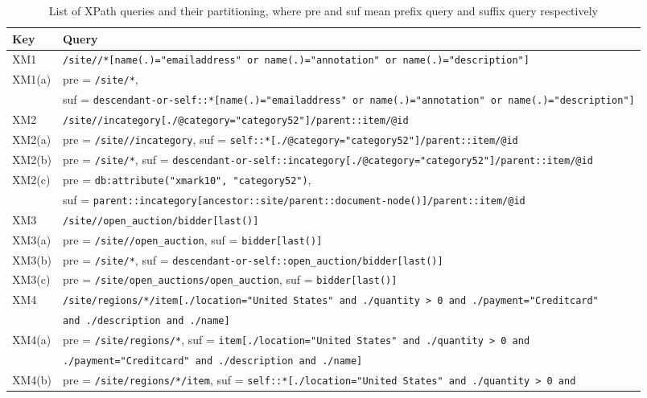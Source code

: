 
\begin{sidewaystable}
\centering
\caption{List of XPath queries and their partitioning, where pre and suf
mean prefix query and suffix query respectively}
\label{tab:dpsqueries}
\small
\begin{tabular}{l|l}
\hline
 Key & Query \\
\hline
 XM1  & \verb|/site//*[name(.)="emailaddress" or name(.)="annotation" or name(.)="description"]| \\
 XM1(a) & pre = \verb|/site/*|, \\
        & suf = \verb|descendant-or-self::*[name(.)="emailaddress" or name(.)="annotation" or name(.)="description"]| \\
\hline
 XM2 & \verb|/site//incategory[./@category="category52"]/parent::item/@id| \\
 XM2(a) & pre = \verb|/site//incategory|, \quad suf = \verb|self::*[./@category="category52"]/parent::item/@id| \\
 XM2(b) & pre = \verb|/site/*|, \quad suf = \verb|descendant-or-self::incategory[./@category="category52"]/parent::item/@id| \\
 XM2(c) & pre = \verb|db:attribute("xmark10", "category52")|, \\
        & suf = \verb|parent::incategory[ancestor::site/parent::document-node()]/parent::item/@id| \\
\hline
 XM3 & \verb|/site//open_auction/bidder[last()]| \\
 XM3(a) & pre = \verb|/site//open_auction|, \quad suf = \verb|bidder[last()]| \\
 XM3(b) & pre = \verb|/site/*|, \quad suf = \verb|descendant-or-self::open_auction/bidder[last()]| \\
 XM3(c) & pre = \verb|/site/open_auctions/open_auction|, \quad suf = \verb|bidder[last()]| \\
\hline
 XM4 & \verb|/site/regions/*/item[./location="United States" and ./quantity > 0 and ./payment="Creditcard"| \\
     & \verb|and ./description and ./name]| \\
 XM4(a) & pre = \verb|/site/regions/*|, \quad suf = \verb|item[./location="United States" and ./quantity > 0 and | \\
        & \verb|./payment="Creditcard" and ./description and ./name]| \\
 XM4(b) & pre = \verb|/site/regions/*/item|, \quad suf = \verb|self::*[./location="United States" and ./quantity > 0 and| \\

\end{tabular}
\end{sidewaystable}

